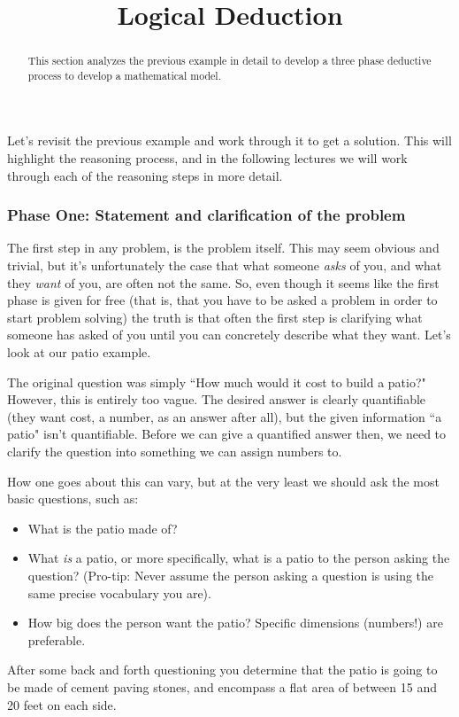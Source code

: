 \documentclass{ximeraXloud}
\title{Logical Deduction}
\begin{document}
\begin{abstract}
    This section analyzes the previous example in detail to develop a three phase deductive process to develop a mathematical model.
\end{abstract}
\maketitle




Let's revisit the previous example and work through it to get a solution. This will highlight the reasoning process, and in the following lectures we will work through each of the reasoning steps in more detail.

\subsubsection*{Phase One: Statement and clarification of the problem}

    \begin{explanation}
        The first step in any problem, is the problem itself. This may seem obvious and trivial, but it's unfortunately the case that what someone \textit{asks} of you, and what they \textit{want} of you, are often not the same. So, even though it seems like the first phase is given for free (that is, that you have to be asked a problem in order to start problem solving) the truth is that often the first step is clarifying what someone has asked of you until you can concretely describe what they want. Let's look at our patio example.
        
        The original question was simply ``How much would it cost to build a patio?" However, this is entirely too vague. The desired answer is clearly quantifiable (they want cost, a number, as an answer after all), but the given information ``a patio" isn't quantifiable. Before we can give a quantified answer then, we need to clarify the question into something we can assign numbers to.
        
        How one goes about this can vary, but at the very least we should ask the most basic questions, such as:
        \begin{itemize}
            \item What is the patio made of?
            \item What \textit{is} a patio, or more specifically, what is a patio to the person asking the question? (Pro-tip: Never assume the person asking a question is using the same precise vocabulary you are).
            \item How big does the person want the patio? Specific dimensions (numbers!) are preferable.
        \end{itemize}
        
        After some back and forth questioning you determine that the patio is going to be made of cement paving stones, and encompass a flat area of between 15 and 20 feet on each side.
    \end{explanation}
    
\end{document}
